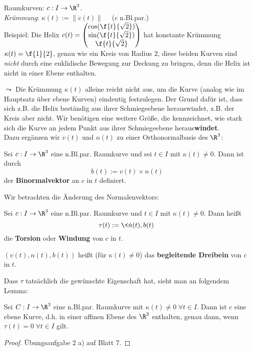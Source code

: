 \documentclass{mycourse}
\newcommand{\kp}{\times} 	 		%
\begin{document}
\setcounter{thm}{3}

Raumkurven: $c: I \to \R^3$. \\
\emph{Krümmung}: $\kappa(t) := \| \ddot c(t) \| \quad$ ($c$ n.Bl.par.) \\
Beispiel: Die Helix $c(t) = \begin{pmatrix} \cos(\f{t}{\sqrt{2}}) \\ \sin(\f{t}{\sqrt{2}}) \\ \f{t}{\sqrt{2}} \end{pmatrix}$  hat konstante Krümmung $\kappa(t) = \f{1}{2}$, genau wie ein Kreis von Radius $2$, diese beiden Kurven sind \emph{nicht} durch eine euklidische Bewegung zur Deckung zu bringen, denn die Helix ist nicht in einer Ebene enthalten. 

$\leadsto$ Die Krümmung $\kappa(t)$ alleine reicht nicht aus, um die Kurve (analog wie im Hauptsatz über ebene Kurven) eindeutig festzulegen. Der Grund dafür ist, dass sich z.B. die Helix beständig aus ihrer Schmiegeebene herauswindet, z.B. der Kreis aber nicht. Wir benötigen eine weitere Größe, die kennzeichnet, wie stark sich die Kurve an jedem Punkt aus ihrer Schmiegeebene heraus\textbf{windet}. \\
Dazu ergänzen wir $v(t)$ und $n(t)$ zu einer Orthonormalbasis des $\R^3$:

\begin{df}
Sei $c: I \to \R^3$ eine n.Bl.par. Raumkurve und sei $t \in I$ mit $\kappa(t) \neq 0$. Dann ist durch
\[ b(t) := v(t) \kp n(t) \]
der \textbf{Binormalvektor} an $c$ in $t$ definiert.
\end{df}

Wir betrachten die Änderung des Normalenvektors:
\begin{df}
Sei $c: I \to \R^3$ eine n.Bl.par. Raumkurve und $t \in I$ mit $\kappa(t) \neq 0$. Dann heißt
\[ \tau(t) := \< \dot n(t), b(t) \> \]
die \textbf{Torsion} oder \textbf{Windung} von $c$ in $t$.
\end{df}

\begin{note*}
$\left( v(t), n(t), b(t) \right)$ heißt (für $\kappa(t) \neq 0$) das \textbf{begleitende Dreibein} von $c$ in $t$.
\end{note*}

Dass $\tau$ tatsächlich die gewünschte Eigenschaft hat, sieht man an folgendem Lemma:
\begin{lem}
Sei $C: I  \to \R^3$ eine n.Bl.par. Raumkurve mit $\kappa(t) \neq 0 \; \forall t \in I$. Dann ist $c$ eine ebene Kurve, d.h. in einer affinen Ebene des $\R^3$ enthalten, genau dann, wenn $\tau(t) = 0 \; \forall t \in I$ gilt.
\begin{proof}
Übungsaufgabe 2 a) auf Blatt 7.
\end{proof} 
\end{lem}
\end{document}
